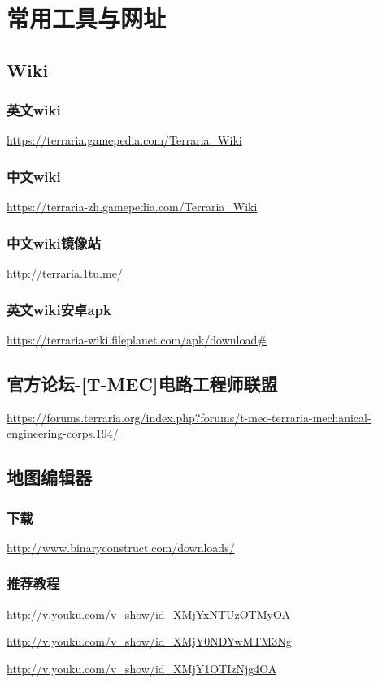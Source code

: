 \chapter{常用工具与网址}\label{app1}

\section{Wiki}\label{app2}
\subsection*{英文wiki}
\url{https://terraria.gamepedia.com/Terraria_Wiki}
\subsection*{中文wiki}
\url{https://terraria-zh.gamepedia.com/Terraria_Wiki}
\subsection*{中文wiki镜像站}
\url{http://terraria.1tu.me/}
\subsection*{英文wiki安卓apk}
\url{https://terraria-wiki.fileplanet.com/apk/download#}

\section{官方论坛-[T-MEC]电路工程师联盟}
\url{https://forums.terraria.org/index.php?forums/t-mec-terraria-mechanical-engineering-corps.194/}

\section{地图编辑器}\label{app3}
\subsection*{下载}
\url{http://www.binaryconstruct.com/downloads/}
\subsection*{推荐教程}
\url{http://v.youku.com/v_show/id_XMjYxNTUzOTMyOA}

\url{http://v.youku.com/v_show/id_XMjY0NDYwMTM3Ng}

\url{http://v.youku.com/v_show/id_XMjY1OTIzNjg4OA}

